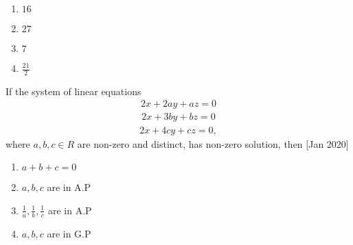 \begin{multicols}{2}
\begin{enumerate}
    \item $16$
    \item $27$
    \item $7$
    \item $\frac{21}{2}$
\end{enumerate}
\end{multicols}
\item If the system of linear equations
\begin{align*}
    2x+2ay+az=0
\end{align*}
\begin{align*}
    2x+3by+bz=0
\end{align*}
\begin{align*}
    2x+4cy+cz=0,
\end{align*}
where $a,b,c \in R $ are non-zero and distinct, has non-zero solution, then \hfill[Jan 2020]
\begin{multicols}{2}
\begin{enumerate}
    \item $a+b+c=0$
    \item $a,b,c$ are in A.P
    \item $\frac{1}{a},\frac{1}{b},\frac{1}{c}$ are in A.P
    \item $a,b,c$ are in G.P
\end{enumerate}
\end{multicols}
